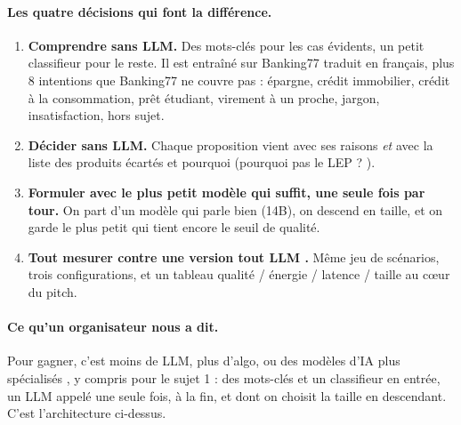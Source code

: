 \paragraph{Les quatre décisions qui font la différence.}
\begin{enumerate}
  \item \textbf{Comprendre sans LLM.} Des mots-clés pour les cas évidents, un petit classifieur
        pour le reste. Il est entraîné sur Banking77 traduit en français, plus 8 intentions que
        Banking77 ne couvre pas : épargne, crédit immobilier, crédit à la consommation, prêt
        étudiant, virement à un proche, jargon, insatisfaction, hors sujet.
  \item \textbf{Décider sans LLM.} Chaque proposition vient avec ses raisons \emph{et} avec la
        liste des produits écartés et pourquoi (\og pourquoi pas le LEP ? \fg).
  \item \textbf{Formuler avec le plus petit modèle qui suffit, une seule fois par tour.} On part
        d'un modèle qui parle bien (14B), on descend en taille, et on garde le plus petit qui tient
        encore le seuil de qualité.
  \item \textbf{Tout mesurer contre une version \og tout LLM \fg.} Même jeu de scénarios, trois
        configurations, et un tableau qualité / énergie / latence / taille au cœur du pitch.
\end{enumerate}

\paragraph{Ce qu'un organisateur nous a dit.} \og Pour gagner, c'est moins de LLM, plus d'algo, ou
des modèles d'IA plus spécialisés \fg, y compris pour le sujet 1 : des mots-clés et un classifieur
en entrée, un LLM appelé une seule fois, à la fin, et dont on choisit la taille en descendant.
C'est l'architecture ci-dessus.

